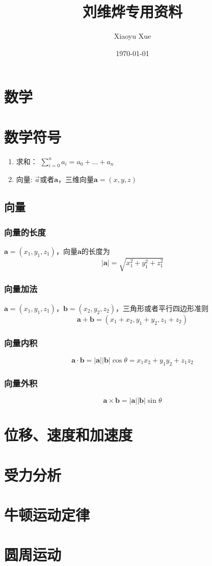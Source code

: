 \documentclass[a4paper,oneside,12pt]{article}
\title{刘维烨专用资料}
\author{Xiaoyu Xue}
\date{\today}
\newcommand{\bol}[1]{\textbf{#1}}
\begin{document}
\maketitle
\section{数学}
\section{数学符号}
\begin{enumerate}
	\item 求和： $\displaystyle \sum_{i = 0} ^ n a_i = a_0 + \ldots + a_n$
	\item 向量: $\vec{a}$或者$\bol{a}$，三维向量$\bol{a} = (x,y,z)$
\end{enumerate}
\subsection{向量}
\subsubsection{向量的长度}
$\bol{a} = (x_1, y_1, z_1)$，向量$\bol{a}$的长度为
\begin{displaymath}
\vert \bol{a} \vert = \sqrt{x_1^2 + y_1^2 + z_1^2}
\end{displaymath}
\subsubsection{向量加法}
$\bol{a} = (x_1, y_1, z_1)$，$\bol{b} = (x_2, y_2, z_2)$，三角形或者平行四边形准则
\begin{displaymath}
\bol{a} + \bol{b} = (x_1 + x_2, y_1 + y_2, z_1 + z_2)
\end{displaymath}
\subsubsection{向量内积}
\begin{displaymath}
\bol{a} \cdot \bol{b} = \vert \bol{a}\vert \vert\bol{b}\vert \cos\theta =x_1x_2 + y_1y_2 + z_1z_2
\end{displaymath}
\subsubsection{向量外积}
\begin{displaymath}
\bol{a}\times\bol{b} = \vert\bol{a}\vert \vert\bol{b}\vert \sin\theta
\end{displaymath}
\section{位移、速度和加速度}
\section{受力分析}
\section{牛顿运动定律}
\section{圆周运动}
\end{document}
